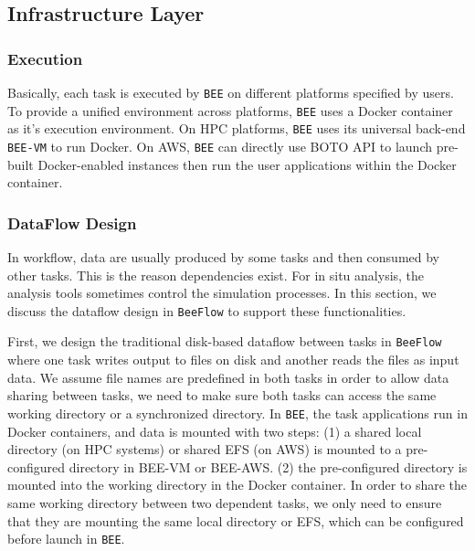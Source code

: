 \subsection{Infrastructure Layer}
\subsubsection{Execution}
Basically, each task is executed by \texttt{BEE} on different platforms specified by users. To provide a unified environment across platforms, \texttt{BEE} uses a Docker container as it's execution environment. On HPC platforms, \texttt{BEE} uses its universal back-end \texttt{BEE-VM} to run Docker. On AWS, \texttt{BEE} can directly use BOTO API to launch pre-built Docker-enabled instances then run the user applications within the Docker container. 

\subsubsection{DataFlow Design}

In workflow, data are usually produced by some tasks and then consumed by other tasks. This is the reason dependencies exist. For in situ analysis, the analysis tools sometimes control the simulation processes. In this section, we discuss the dataflow design in \texttt{BeeFlow} to support these functionalities.

First, we design the traditional disk-based dataflow between tasks in \texttt{BeeFlow} where one task writes output to files on disk and another reads the files as input data. We assume file names are predefined in both tasks in order to allow data sharing between tasks, we need to make sure both tasks can access the same working directory or a synchronized directory. In \texttt{BEE}, the task applications run in Docker containers, and data is mounted with two steps: (1) a shared local directory (on HPC systems) or shared EFS (on AWS) is mounted to a pre-configured directory in BEE-VM or BEE-AWS. (2) the pre-configured directory is mounted into the working directory in the Docker container. In order to share the same working directory between two dependent tasks, we only need to ensure that they are mounting the same local directory or EFS, which can be configured before launch in \texttt{BEE}. 

